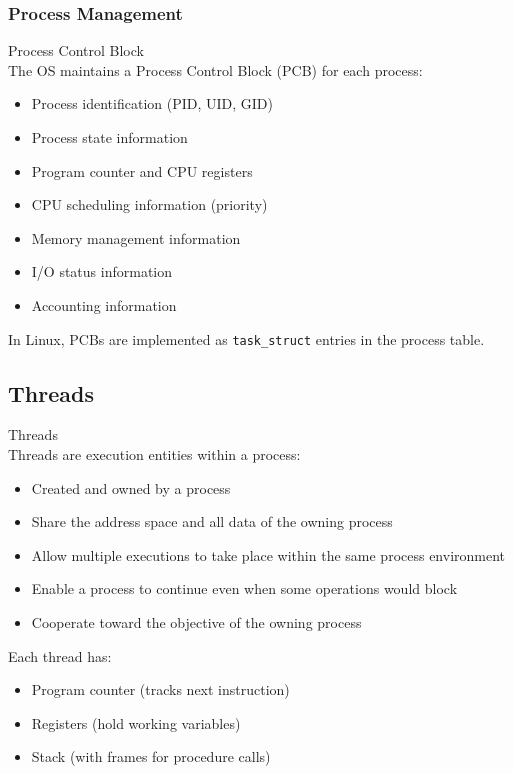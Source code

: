 \multend

\subsubsection{Process Management}

\begin{definition}{Process Control Block}\\
    The OS maintains a Process Control Block (PCB) for each process:
    \begin{itemize}
        \item Process identification (PID, UID, GID)
        \item Process state information
        \item Program counter and CPU registers
        \item CPU scheduling information (priority)
        \item Memory management information
        \item I/O status information
        \item Accounting information
    \end{itemize}
    
    In Linux, PCBs are implemented as \texttt{task\_struct} entries in the process table.
\end{definition}

\subsection{Threads}


\begin{definition}{Threads}\\
    Threads are execution entities within a process:
    \begin{itemize}
        \item Created and owned by a process
        \item Share the address space and all data of the owning process
        \item Allow multiple executions to take place within the same process environment
        \item Enable a process to continue even when some operations would block
        \item Cooperate toward the objective of the owning process
    \end{itemize}
    
    Each thread has:
    \begin{itemize}
        \item Program counter (tracks next instruction)
        \item Registers (hold working variables)
        \item Stack (with frames for procedure calls)
    \end{itemize}
\end{definition}

